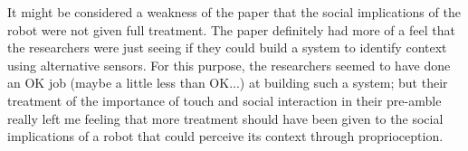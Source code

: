 \documentclass{article}
\begin{document}
It might be considered a weakness of the paper that the social implications of the robot were not given full treatment. The paper definitely had more of a feel that the researchers were just seeing if they could build a system to identify context using alternative sensors. For this purpose, the researchers seemed to have done an OK job (maybe a little less than OK...) at building such a system; but their treatment of the importance of touch and social interaction in their pre-amble really left me feeling that more treatment should have been given to the social implications of a robot that could perceive its context through proprioception.
\end{document}
